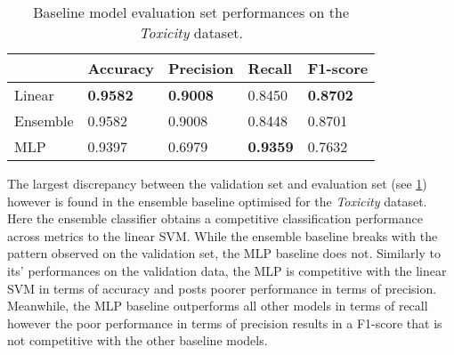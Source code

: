 \begin{table}[h]
  \centering
  \begin{tabular}{l|llll}
                          & Accuracy        & Precision       & Recall          & F1-score        \\\hline
    Linear                & \textbf{0.9582} & \textbf{0.9008} & 0.8450          & \textbf{0.8702} \\
    Ensemble\footnotemark & 0.9582          & 0.9008          & 0.8448          & 0.8701          \\
    MLP                   & 0.9397          & 0.6979          & \textbf{0.9359} & 0.7632
  \end{tabular}
  \caption{Baseline model evaluation set performances on the \textit{Toxicity} dataset.}
  \label{tab:baseline_test_wulczyn}
\end{table}

The largest discrepancy between the validation set and evaluation set (see \cref{tab:baseline_test_wulczyn}) however is found in the ensemble baseline optimised for the \textit{Toxicity} dataset.
Here the ensemble classifier obtains a competitive classification performance across metrics to the linear SVM.
While the ensemble baseline breaks with the pattern observed on the validation set, the MLP baseline does not.
Similarly to its' performances on the validation data, the MLP is competitive with the linear SVM in terms of accuracy and posts poorer performance in terms of precision.
Meanwhile, the MLP baseline outperforms all other models in terms of recall however the poor performance in terms of precision results in a F1-score that is not competitive with the other baseline models.

